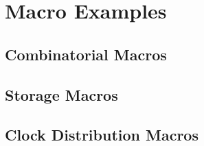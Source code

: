 \part{Macro Examples}
\pagestyle{headings}


\chapter{Combinatorial Macros}




\chapter{Storage Macros}




\chapter{Clock Distribution Macros}



